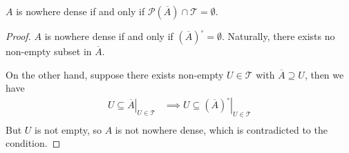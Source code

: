 \begin{proposition}
	$A$ is nowhere dense if and only if $\mathcal P(\overline A) \cap \mathcal T = \emptyset$.
	
	\begin{proof}
		$A$ is nowhere dense if and only if $(\overline A)^\circ = \emptyset$. Naturally, there exists no non-empty subset in $\overline A$.
		
		On the other hand, suppose there exists non-empty $U \in \mathcal T$ with $\overline A \supseteq U$, then we have
		$$
		\begin{aligned}
			\left. U \subseteq \overline A \right|_{U \in \mathcal T} &\implies \left. U \subseteq (\overline A)^\circ \right|_{U \in \mathcal T} \\
		\end{aligned}
		$$
		But $U$ is not empty, so $A$ is not nowhere dense, which is contradicted to the condition.
	\end{proof}
\end{proposition}






















%